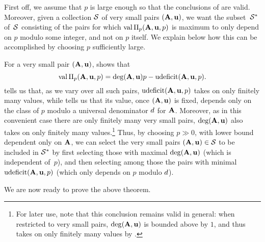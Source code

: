 \documentclass{article}
\begin{document}
\begin{remark}
   \label{p large m-primary: R} 
   First off, we assume that $p$ is large enough so that the conclusions of  are valid.
   Moreover, given a collection $\S$ of very small pairs $(\matA,\vv{u})$, we want the subset~$\S^*$ of~$\S$ consisting of the pairs for which $\val \IP_p(\matA,\vv{u},p)$ is maximum to only depend on $p$ modulo some integer, and not on $p$ itself.
   We explain below how this can be accomplished by choosing $p$ sufficiently large.

   For a very small pair $(\matA,\vv{u})$,  shows that
   \[ \val \IP_p(\matA,\vv{u},p) = \degree(\matA,\vv{u})p-\udeficit(\matA,\vv{u},p).\]
    tells us that, as we vary over all such pairs, $\udeficit(\matA,\vv{u},p)$ takes on only finitely many values, while  tells us that its value, once $(\matA,\vv{u})$ is fixed, depends only on the class of $p$ modulo a universal denominator $\denom$ for $\matA$.
   Moreover, as in this convenient case there are only finitely many very small pairs, $\degree(\matA,\vv{u})$ also takes on only finitely many values.\footnote{For later use, note that this conclusion remains valid in general: when restricted to very small pairs, $\degree(\matA,\vv{u})$ is bounded above by $1$, and thus takes on only finitely many values by .}
   Thus, by choosing $p\gg 0$, with lower bound dependent only on $\matA$, we can select the very small pairs $(\matA,\vv{u}) \in \S$ to be included in $\S^*$ by first selecting those with maximal $\degree(\matA,\vv{u})$ (which is independent of~$p$), and then selecting among those the pairs with minimal $\udeficit(\matA,\vv{u},p)$ (which only depends on $p$ modulo $\denom$).
\end{remark}

We are now ready to prove the above theorem.
\end{document}
